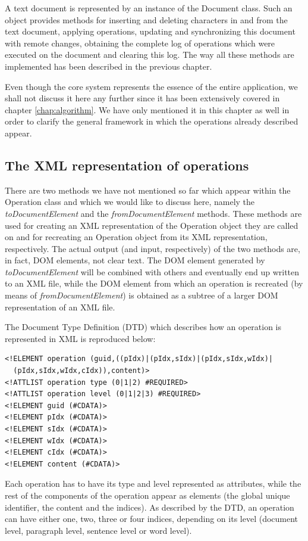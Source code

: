 A text document is represented by an instance of the Document class. Such an object provides
methods for inserting and deleting characters in and from the text document, applying
operations, updating and synchronizing this document with remote changes, obtaining the
complete log of operations which were executed on the document and clearing this log. The
way all these methods are implemented has been described in the previous chapter.

Even though the core system represents the essence of the entire application, we shall not
discuss it here any further since it has been extensively covered in chapter
\ref{chap:algorithm}. We have only mentioned it in this chapter as well in order to clarify
the general framework in which the operations already described appear.

\subsection{The XML representation of operations}

There are two methods we have not mentioned so far which appear within the Operation class
and which we would like to discuss here, namely the \emph{toDocumentElement} and the
\emph{fromDocumentElement} methods. These methods are used for creating an XML representation
of the Operation object they are called on and for recreating an Operation object from its
XML representation, respectively. The actual output (and input, respectively) of the two
methods are, in fact, DOM elements, not clear text. The DOM element generated by
\emph{toDocumentElement} will be combined with others and eventually end up written
to an XML file, while the DOM element from which an operation is recreated (by means
of \emph{fromDocumentElement}) is obtained as a subtree of a larger DOM representation
of an XML file.

The Document Type Definition (DTD) which describes how an operation is represented in XML
is reproduced below:

\begin{verbatim}
<!ELEMENT operation (guid,((pIdx)|(pIdx,sIdx)|(pIdx,sIdx,wIdx)|
  (pIdx,sIdx,wIdx,cIdx)),content)>
<!ATTLIST operation type (0|1|2) #REQUIRED>
<!ATTLIST operation level (0|1|2|3) #REQUIRED>
<!ELEMENT guid (#CDATA)>
<!ELEMENT pIdx (#CDATA)>
<!ELEMENT sIdx (#CDATA)>
<!ELEMENT wIdx (#CDATA)>
<!ELEMENT cIdx (#CDATA)>
<!ELEMENT content (#CDATA)>
\end{verbatim}

Each operation has to have its type and level represented as attributes, while the rest of
the components of the operation appear as elements (the global unique identifier, the
content and the indices). As described by the DTD, an operation can have either one, two,
three or four indices, depending on its level (document level, paragraph level, sentence
level or word level).

